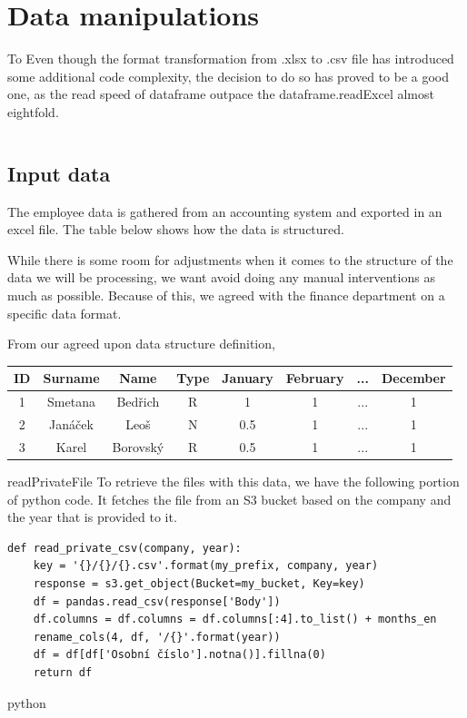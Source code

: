 \documentclass[12pt,oneside]{fithesis2}
\begin{document}
\section{Data manipulations}
To 
Even though the format transformation from .xlsx to .csv file has introduced some additional code complexity, the decision to do so has proved to be a good one, as the read speed of dataframe outpace the dataframe.readExcel almost eightfold. \cite{csv-read-speed}

\begin{lstlisting}

\end{lstlisting}

\subsection{Input data}
The employee data is gathered from an accounting system and exported in an excel file. The table below shows how the data is structured.

While there is some room for adjustments when it comes to the structure of the data we will be processing, we want avoid doing any manual interventions as much as possible. Because of this, we agreed with the finance department on a specific data format.

From our agreed upon data structure definition, 
\begin{center}
\begin{tabular}{ |c|c|c|c|c|c|c|c| } 
\hline
ID & Surname & Name & Type & January & February & ... & December \\
\hline
1 & Smetana & Bedřich & R & 1 & 1 & ... & 1\\ 
2 & Janáček & Leoš & N & 0.5 & 1 & ... & 1\\ 
3 & Karel & Borovský & R & 0.5 & 1 & ... & 1\\ 
\hline
\end{tabular}
\end{center}

readPrivateFile To retrieve the files with this data, we have the following portion of python code. It fetches the file from an S3 bucket based on the company and the year that is provided to it.


\begin{verbatim}
def read_private_csv(company, year):
    key = '{}/{}/{}.csv'.format(my_prefix, company, year)
    response = s3.get_object(Bucket=my_bucket, Key=key)
    df = pandas.read_csv(response['Body'])
    df.columns = df.columns = df.columns[:4].to_list() + months_en
    rename_cols(4, df, '/{}'.format(year))
    df = df[df['Osobní číslo'].notna()].fillna(0)
    return df
\end{verbatim}{python}
\end{document}

